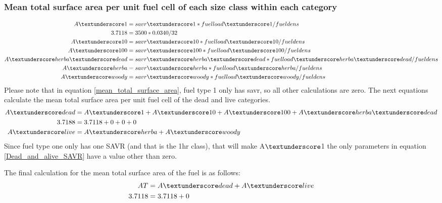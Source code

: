 \documentclass{article}
\newcommand\und{\textunderscore}
\begin{document}
\subsubsection*{Mean total surface area per unit fuel cell of each size class within each category}
\begin{equation}
	\label{mean_total_surface_area}
	\begin{split}
		A\textunderscore 1    &= savr\textunderscore 1 * fuelload\textunderscore 1 / fueldens \\
				3.7118 &= 3500 * 0.0340 / 32 \\
		A\textunderscore 10    &= savr\textunderscore 10 * fuelload\textunderscore 10 / fueldens \\
		A\textunderscore 100   &= savr\textunderscore 100 * fuelload\textunderscore 100 / fueldens \\
		A\textunderscore herba\textunderscore dead  &= savr\textunderscore herba\textunderscore dead * fuelload\textunderscore herba\textunderscore dead / fueldens \\
		A\textunderscore herba &= savr\textunderscore herba * fuelload\textunderscore herba / fueldens \\
		A\textunderscore woody &= savr\textunderscore woody * fuelload\textunderscore woody / fueldens 
	\end{split}
\end{equation}
Please note that in equation \ref{mean_total_surface_area}, fuel type 1 only has savr, so all other calculations are zero. 
The next equations calculate the mean total surface area per unit fuel cell of the dead and live categories. 
\begin{equation}
	\label{Dead_and_alive_SAVR}
	\begin{split}
		A\und dead        &= A\und1 + A\und10 + A\und100 + A\und herba\und dead \\
				3.7188 &= 3.7118 + 0 + 0 + 0 \\
		A\und live        &= A\und herba + A\und woody 
	\end{split}
\end{equation}
Since fuel type one only has one SAVR (and that is the 1hr class), that will make A$\und$1 the only parameters in equation \ref{Dead_and_alive_SAVR} have a value other than zero. 

The final calculation for the mean total surface area of the fuel is as follows: 
\begin{equation}
	\label{mean_SAVR}
	\begin{split}
		AT            &= A\und dead + A\und live \\ 
		3.7118 &= 3.7118 + 0
	\end{split}
\end{equation}
\end{document}
